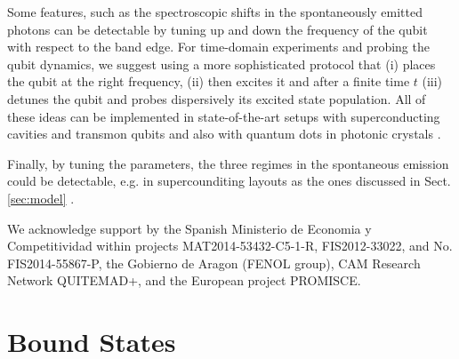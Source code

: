 \documentclass[aps,pra,twocolumn,floatfix,superscriptaddress]{revtex4-1}%
\begin{document}
Some features, such as the spectroscopic shifts in the spontaneously emitted photons can be detectable by tuning up and down the frequency of the qubit with respect to the band edge. For time-domain experiments and probing the qubit dynamics, we suggest using a more sophisticated protocol that (i) places the qubit at the right frequency, (ii) then excites it and after a finite time $t$ (iii) detunes the qubit and probes dispersively its excited state population. All of these ideas can be implemented in state-of-the-art setups with superconducting cavities and transmon qubits \cite{liu2016} and also with quantum dots in photonic crystals \cite{Arcari2014,Sollner2015,Lodahl2015}.  

Finally, by tuning the parameters, the three regimes in the spontaneous emission could be detectable, e.g. in supercounditing layouts as the ones discussed in Sect. \ref{sec:model} \cite{liu2016}.


\begin{acknowledgements}
We acknowledge 
support by the Spanish Ministerio de Economia y Competitividad within projects MAT2014-53432-C5-1-R, FIS2012-33022, and No. FIS2014-55867-P, the Gobierno
de Aragon (FENOL group), CAM Research Network QUITEMAD+,
and the European project PROMISCE.
\end{acknowledgements}

\appendix

\section{Bound States}\label{app:eigen}



\end{document}

